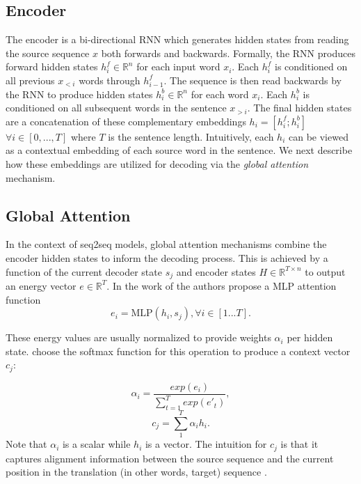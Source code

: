 \subsection{Encoder}
The encoder is a bi-directional \ac{RNN} which generates hidden states from reading the source sequence $x$ both forwards and backwards. Formally, the \ac{RNN} produces forward hidden states $h^{f}_{i} \in \mathbb{R}^{n}$ for each input word $x_{i}$. Each $h^{f}_{i}$ is conditioned on all previous $x_{<i}$ words through $h_{i-1}^{f}$. The sequence is then read backwards by the \ac{RNN} to produce hidden states $h^{b}_{i} \in \mathbb{R}^{n}$ for each word $x_{i}$. Each $h^{b}_{i}$ is conditioned on all subsequent words in the sentence $x_{>i}$. The final hidden states are a concatenation of these complementary embeddings $h_{i}  = [h^{f}_{i} ; h^{b}_{i}]$ $ \forall i \in [0,...,T]$ where $T$ is the sentence length. Intuitively, each $h_{i}$ can be viewed as a contextual embedding of each source word in the sentence. We next describe how these embeddings are utilized for decoding via the \textit{global attention} mechanism. %

\subsection{Global Attention}

In the context of \ac{seq2seq} models, global attention mechanisms combine the encoder hidden states to inform the decoding process. This is achieved by a function of the current decoder state $s_{j}$ and encoder states $H \in \mathbb{R}^{T \times n}$ to output an energy vector $e \in \mathbb{R}^{T}$. In the work of \citet{bahdanau2014NMTBYJoint} the authors propose a \ac{MLP} attention function
\begin{equation}
e_{i} = \text{MLP}(h_{i}, s_{j}), \forall i \in [1...T].
\end{equation}

These energy values are usually normalized to provide weights $\alpha_{i}$ per hidden state. \citet{bahdanau2014NMTBYJoint} choose the softmax function for this operation to produce a context vector $c_{j}$:

\begin{equation}
	\alpha_{i} = \frac{exp(e_{i})}{\sum_{t=1}^{T} exp(e'_{t})},
\end{equation}
\begin{equation}
c_{j} = \sum_{1}^{T} \alpha_{i}  h_{i}.
\end{equation}
Note that $\alpha_{i}$ is  a scalar while $h_{i}$ is a vector. The intuition for $c_{j}$ is that it captures alignment information between the source sequence and the current position in the translation (in other words, target) sequence \cite{bahdanau2014NMTBYJoint}. %

